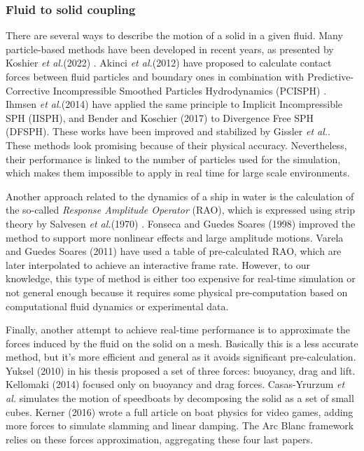 \documentclass[final]{jcgt}
\def\Framework{The Arc Blanc framework\xspace}
\def\etal{\emph{et al.}\xspace}
\begin{document}
\subsubsection{Fluid to solid coupling}
\label{subsubsec:fluidToSolidCoupling}
There are several ways to describe the motion of a solid in a given fluid.
Many particle-based methods have been developed in recent years, as presented by Koshier \etal (2022) \cite{koschierSurveySPHMethods2022}.
Akinci \etal (2012) \cite{akinciVersatileRigidfluidCoupling2012} have proposed to calculate contact forces between fluid particles and boundary ones in combination with Predictive-Corrective Incompressible Smoothed Particles Hydrodynamics (PCISPH) \cite{solenthalerPredictivecorrectiveIncompressibleSPH2009}.
Ihmsen \etal (2014) \cite{ihmsenImplicitIncompressibleSPH2014} have applied the same principle to Implicit Incompressible SPH (IISPH), and Bender and Koschier (2017)  \cite{benderDivergenceFreeSPHIncompressible2017} to Divergence Free SPH (DFSPH).
These works have been improved and stabilized by Gissler  \etal \cite{gisslerInterlinkedSPHPressure2019}.
These methods look promising because of their physical accuracy.
Nevertheless, their performance is linked to the number of particles used for the simulation, which makes them impossible to apply in real time for large scale environments.

Another approach related to the dynamics of a ship in water is the calculation of the so-called \emph{Response Amplitude Operator} (RAO), which is expressed using strip theory by Salvesen  \etal (1970) \cite{salvesenShipMotionsSea1970}. Fonseca and Guedes Soares (1998) \cite{fonsecaTimeDomainAnalysisLargeAmplitude1998} improved the method to support more nonlinear effects and large amplitude motions. Varela and Guedes Soares (2011) \cite{varelaInteractiveSimulationShip2011} have used a table of pre-calculated RAO, which are later interpolated to achieve an interactive frame rate.
However, to our knowledge, this type of method is either too expensive for real-time simulation or not general enough because it requires some physical pre-computation based on computational fluid dynamics or experimental data.

Finally, another attempt to achieve real-time performance is to approximate the forces induced by the fluid on the solid on a mesh.
Basically this is a less accurate method, but it's more efficient and general as it avoids significant pre-calculation.
Yuksel (2010) \cite{yukselRealtimeWaterWaves2010} in his thesis proposed a set of three forces: buoyancy, drag and lift.
Kellomaki (2014) \cite{kellomakiRigidBodyInteraction2014} focused only on buoyancy and drag forces.
Casas-Yrurzum  \etal \cite{casas-yrurzumRealtimePhysicsSimulation2012a} simulates the motion of speedboats by decomposing the solid as a set of small cubes.
Kerner (2016) \cite{kernerWaterInteractionModel2016} wrote a full article on boat physics for video games, adding more forces to simulate slamming and linear damping.
\Framework relies on these forces approximation, aggregating these four last papers.
\end{document}
